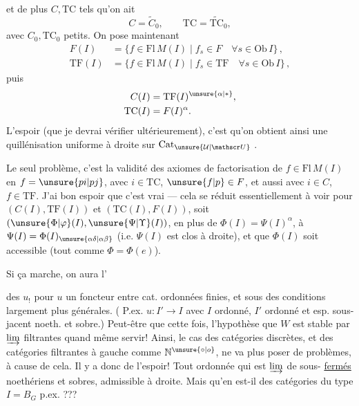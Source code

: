 et de plus  $C,\mathrm{TC}$  tels qu'on ait
\[
C=\widetilde{C}_0,\qquad \mathrm{TC}=\widetilde{\mathrm{TC}}_0,
\]
avec $C_0,\mathrm{TC}_0$ petits. On pose maintenant
\[
\begin{aligned}
F(I)&=\{f\in\mathrm{Fl}\,M(I)\mid f_s\in F\quad \forall s\in\mathrm{Ob}\,I\}\,,\\
\mathrm{TF}(I)&=\{f\in\mathrm{Fl}\,M(I)\mid f_s\in\mathrm{TF}\quad \forall s\in\mathrm{Ob}\,I\}\,,
\end{aligned}
\]
puis
\[
\begin{aligned}
C(I)&=\mathrm{TF}(I)^{\unsure{\alpha|\ast}},\\
\mathrm{TC}(I)&=F(I)^\alpha.
\end{aligned}
\]
L'espoir (que je devrai vérifier ultérieurement), c'est qu'on obtient ainsi une quillénisation uniforme à droite  sur $\mathrm{Cat}_{\unsure{\mathcal U|\mathscr U}}$ .

Le seul problème, c'est la validité des axiomes de factorisation de $f\in\mathrm{Fl}\,M(I)$ en $f=\unsure{pi|pj}$, avec $i\in\mathrm{TC}$, $\unsure{f|p}\in F$, et aussi avec $i\in C$, $f\in\mathrm{TF}$. J'ai bon espoir que c'est vrai --- cela se réduit essentiellement à voir pour $(C(I),\mathrm{TF}(I))$  et $(\mathrm{TC}(I),F(I))$,  soit $(\unsure{\Phi|\varphi}(I),\unsure{\Psi|\Upsilon}(I))$,  en plus de $\Phi(I)=\Psi(I)^\alpha$, à $\Psi(I)=\Phi(I)_{\unsure{\alpha\delta|\alpha\beta}}$ (i.e. $\Psi(I)$ est clos à droite), et que $\Phi(I)$ soit accessible (tout comme $\Phi=\Phi(e)$).

Si ça marche, on aura l'

des $u_!$ pour $u$ un foncteur entre cat. ordonnées finies, et sous des conditions largement plus générales. ( P.ex. $u:I'\longrightarrow I$ avec $I$ ordonné, $I'$ ordonné et esp. sous-jacent noeth. et sobre.) Peut-être que cette fois, l'hypothèse que $W$ est stable par $\varinjlim$ filtrantes  quand même servir! Ainsi, le cas des catégories discrètes, et des catégories filtrantes à gauche comme $\mathbb N^{\unsure{\circ|o}}$, ne va plus poser de problèmes, à cause de cela. Il y a donc de l'espoir! Tout   ordonnée qui est $\varinjlim$  de sous-  \uline{fermés} noethériens et sobres,  admissible à droite. Mais qu'en est-il des catégories du type $I=B_G$ p.ex. ???


